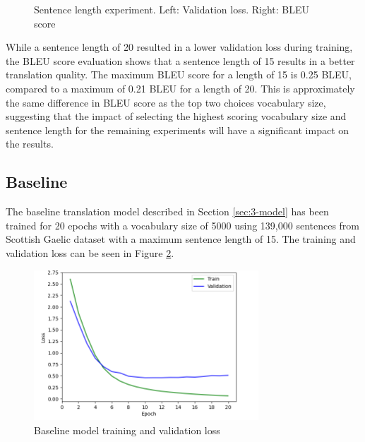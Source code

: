 \begin{figure}[ht!]
\centering
{}
\captionsetup{justification=centering}
\caption[Sentence length experiment validation loss and BLEU score]{Sentence length experiment. Left: Validation loss. Right: BLEU score}
\label{fig:length_loss_bleu}
\end{figure}

While a sentence length of 20 resulted in a lower validation loss during training, the \acrshort{BLEU} score evaluation shows that a sentence length of 15 results in a better translation quality. The maximum \acrshort{BLEU} score for a length of 15 is 0.25 \acrshort{BLEU}, compared to a maximum of 0.21 \acrshort{BLEU} for a length of 20. This is approximately the same difference in \acrshort{BLEU} score as the top two choices vocabulary size, suggesting that the impact of selecting the highest scoring vocabulary size and sentence length for the remaining experiments will have a significant impact on the results. 


\subsection{Baseline}
\label{sec:4-baseline}

The baseline translation model described in Section \ref{sec:3-model} has been trained for 20 epochs with a vocabulary size of 5000 using 139,000 sentences from Scottish Gaelic dataset with a maximum sentence length of 15. The training and validation loss can be seen in Figure \ref{fig:loss_baseline}.

\begin{figure}[ht!]
\centering
\includegraphics[width=0.75\textwidth]{media/experiments/loss/5k/loss_baseline.png}
\captionsetup{justification=centering}
\caption[Baseline model training and validation loss]{Baseline model training and validation loss}
\label{fig:loss_baseline}
\end{figure}

